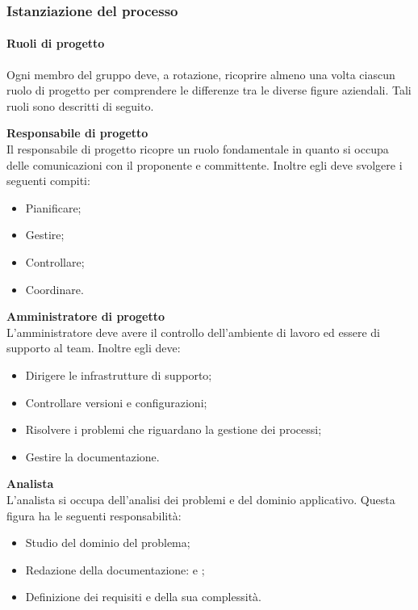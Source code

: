 \subsubsection{Istanziazione del processo}
\paragraph{Ruoli di progetto}
Ogni membro del gruppo deve, a rotazione, ricoprire almeno una volta ciascun ruolo di progetto per comprendere le differenze tra le diverse figure aziendali. Tali ruoli sono descritti di seguito.

\mbox{}

\textbf{Responsabile di progetto}\\
Il responsabile di progetto ricopre un ruolo fondamentale in quanto si occupa delle comunicazioni con il proponente e committente. Inoltre egli deve svolgere i seguenti compiti:
\begin{itemize}
\item Pianificare;
\item Gestire;
\item Controllare;
\item Coordinare.
\end{itemize}

\mbox{}

\textbf{Amministratore di progetto}\\
L'amministratore deve avere il controllo dell'ambiente di lavoro ed essere di supporto al team. Inoltre egli deve: 
\begin{itemize}
\item Dirigere le infrastrutture di supporto;
\item Controllare versioni e configurazioni;
\item Risolvere i problemi che riguardano la gestione dei processi;
\item Gestire la documentazione.
\end{itemize}

\mbox{}

\textbf{Analista}\\
L'analista si occupa dell'analisi dei problemi e del dominio applicativo. Questa figura ha le seguenti responsabilità:
\begin{itemize}
\item Studio del dominio del problema; 
\item Redazione della documentazione: \AdR{} e \SdF{};
\item Definizione dei requisiti e della sua complessità.
\end{itemize}

